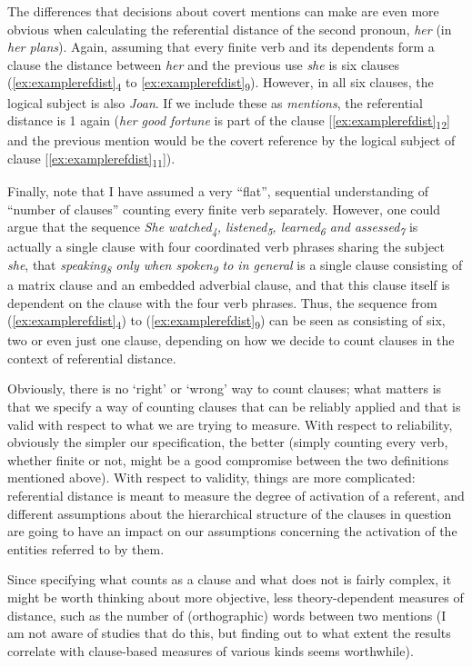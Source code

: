 The differences that decisions about covert mentions can make are even more obvious when calculating the referential distance of the second pronoun, \textit{her} (in \textit{her plans}). Again, assuming that every finite verb and its dependents form a clause the distance between \textit{her} and the previous use \textit{she} is six clauses (\ref{ex:examplerefdist}\textsubscript{4} to \ref{ex:examplerefdist}\textsubscript{9}). However, in all six clauses, the logical subject is also \textit{Joan}. If we include these as \textit{mentions}, the referential distance is 1 again (\textit{her good fortune} is part of the clause [\ref{ex:examplerefdist}\textsubscript{12}] and the previous mention would be the covert reference by the logical subject of clause [\ref{ex:examplerefdist}\textsubscript{11}]).

Finally, note that I have assumed a very ``flat'', sequential understanding of ``number of clauses'' counting every finite verb separately. However, one could argue that the sequence \textit{She watched\textsubscript{4}, listened\textsubscript{5}, learned\textsubscript{6} and assessed\textsubscript{7}} is actually a single clause with four coordinated verb phrases sharing the subject \textit{she}, that \textit{speaking\textsubscript{8} only when spoken\textsubscript{9} to in general} is a single clause consisting of a matrix clause and an embedded adverbial clause, and that this clause itself is dependent on the clause with the four verb phrases. Thus, the sequence from (\ref{ex:examplerefdist}\textsubscript{4}) to (\ref{ex:examplerefdist}\textsubscript{9}) can be seen as consisting of six, two or even just one clause, depending on how we decide to count clauses in the context of referential distance.

Obviously, there is no `right' or `wrong' way to count clauses; what matters is that we specify a way of counting clauses that can be reliably applied and that is valid with respect to what we are trying to measure. With respect to reliability, obviously the simpler our specification, the better (simply counting every verb, whether finite or not, might be a good compromise between the two definitions mentioned above). With respect to validity, things are more complicated: referential distance is meant to measure the degree of activation of a referent, and different assumptions about the hierarchical structure of the clauses in question are going to have an impact on our assumptions concerning the activation of the entities referred to by them.

Since specifying what counts as a clause and what does not is fairly complex, it might be worth thinking about more objective, less theory-dependent measures of distance, such as the number of (orthographic) words between two mentions (I am not aware of studies that do this, but finding out to what extent the results correlate with clause-based measures of various kinds seems worthwhile). 

